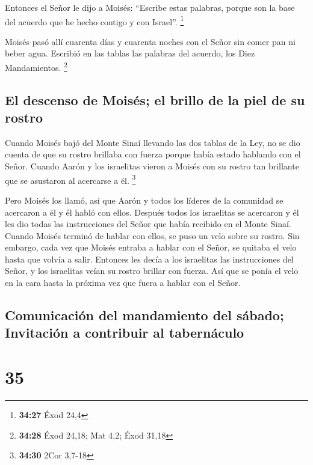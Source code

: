  Entonces el Señor le dijo a Moisés: ``Escribe estas
palabras, porque son la base del acuerdo que he hecho contigo y con
Israel''. \footnote{\textbf{34:27} Éxod 24,4}

 Moisés pasó allí cuarenta días y cuarenta noches con el
Señor sin comer pan ni beber agua. Escribió en las tablas las palabras
del acuerdo, los Diez Mandamientos. \footnote{\textbf{34:28} Éxod 24,18;
  Mat 4,2; Éxod 31,18}

\hypertarget{el-descenso-de-moisuxe9s-el-brillo-de-la-piel-de-su-rostro}{%
\subsection{El descenso de Moisés; el brillo de la piel de su
rostro}\label{el-descenso-de-moisuxe9s-el-brillo-de-la-piel-de-su-rostro}}

 Cuando Moisés bajó del Monte Sinaí llevando las dos
tablas de la Ley, no se dio cuenta de que su rostro brillaba con fuerza
porque había estado hablando con el Señor.  Cuando Aarón
y los israelitas vieron a Moisés con su rostro tan brillante que se
asustaron al acercarse a él. \footnote{\textbf{34:30} 2Cor 3,7-18}

 Pero Moisés los llamó, así que Aarón y todos los líderes
de la comunidad se acercaron a él y él habló con ellos. 
Después todos los israelitas se acercaron y él les dio todas las
instrucciones del Señor que había recibido en el Monte Sinaí.
 Cuando Moisés terminó de hablar con ellos, se puso un
velo sobre su rostro.  Sin embargo, cada vez que Moisés
entraba a hablar con el Señor, se quitaba el velo hasta que volvía a
salir. Entonces les decía a los israelitas las instrucciones del Señor,
 y los israelitas veían su rostro brillar con fuerza. Así
que se ponía el velo en la cara hasta la próxima vez que fuera a hablar
con el Señor.

\hypertarget{comunicaciuxf3n-del-mandamiento-del-suxe1bado-invitaciuxf3n-a-contribuir-al-tabernuxe1culo}{%
\subsection{Comunicación del mandamiento del sábado; Invitación a
contribuir al
tabernáculo}\label{comunicaciuxf3n-del-mandamiento-del-suxe1bado-invitaciuxf3n-a-contribuir-al-tabernuxe1culo}}

\hypertarget{section-34}{%
\section{35}\label{section-34}}

